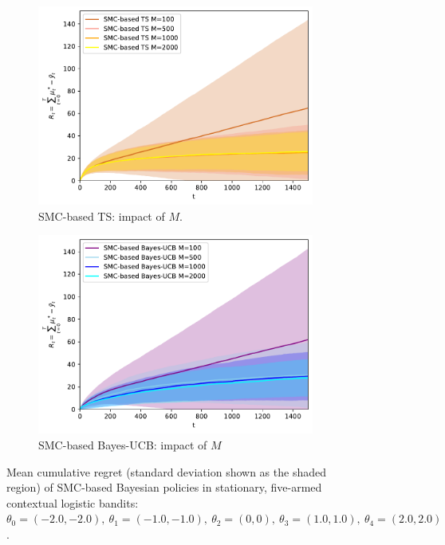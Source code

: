 \begin{figure}[!h]
	\begin{subfigure}[b]{0.46\textwidth}
		\centering
		\includegraphics[width=\textwidth]{./fods_figs/static/logistic/A5/theta-2._-2._-1._-1._0._0._1._1._2._2._allM_cumulative_regret_ts}
		\caption{SMC-based TS: impact of $M$.}
	\end{subfigure}
	\begin{subfigure}[b]{0.46\textwidth}
		\centering
		\includegraphics[width=\textwidth]{./fods_figs/static/logistic/A5/theta-2._-2._-1._-1._0._0._1._1._2._2._allM_cumulative_regret_bucb}
		\caption{SMC-based Bayes-UCB: impact of $M$}
	\end{subfigure}
	
	\caption{Mean cumulative regret (standard deviation shown as the shaded region) of SMC-based Bayesian policies in
		stationary, five-armed contextual logistic bandits:
		$\theta_0=(-2.0,-2.0), \ \theta_1=(-1.0,-1.0), \ \theta_2=(0,0), \ \theta_3=(1.0,1.0), \ \theta_4=(2.0,2.0)$.
	}
\end{figure}